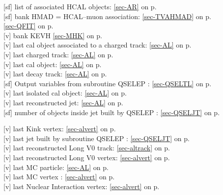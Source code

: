  [sf] list of associated HCAL objects: \ref{sec-AR} on p.~\pageref{sec-AR}\\
 [sf] bank HMAD = HCAL--muon association:
 \ref{sec-TVAHMAD} on p.~\pageref{sec-TVAHMAD}\\
 \ref{sec-QFIT} on p.~\pageref{sec-QFIT}\\
 [v] bank KEVH \ref{sec-MHK} on p.~\pageref{sec-MHK}\\
 [v] last cal object associated to a charged track:
 \ref{sec-AL} on p.~\pageref{sec-AL}\\
 [v] last charged track: \ref{sec-AL} on p.~\pageref{sec-AL}\\
 [v] last cal object: \ref{sec-AL} on p.~\pageref{sec-AL}\\
 [v] last decay track: \ref{sec-AL} on p.~\pageref{sec-AL}\\
 [sf] Output variables from subroutine QSELEP : \ref{sec-QSELTL} on p.~\pageref{sec-QSELTL}\\
 [v] last isolated cal object: \ref{sec-AL} on p.~\pageref{sec-AL}\\
 [v] last reconstructed jet: \ref{sec-AL} on p.~\pageref{sec-AL}\\
 [sf] number of objects inside jet built by QSELEP : \ref{sec-QSELJT} on p.~\pageref{sec-QSELJT}
 
 [v] last Kink vertex: \ref{sec-alvert} on p.~\pageref{sec-alvert}\\
 [v] last jet built by subroutine QSELEP : \ref{sec-QSELJT} on p.~\pageref{sec-QSELJT}\\
 [v] last reconstructed Long V0 track: \ref{sec-altrack} on p.~\pageref{sec-altrack}\\
 [v] last reconstructed Long V0 vertex: \ref{sec-alvert} on p.~\pageref{sec-alvert}\\
 [v] last MC particle: \ref{sec-AL} on p.~\pageref{sec-AL}\\
 [v] last MC vertex  : \ref{sec-alvert} on p.~\pageref{sec-alvert}\\
 [v] last Nuclear Interaction vertex: \ref{sec-alvert} on p.~\pageref{sec-alvert}
 

